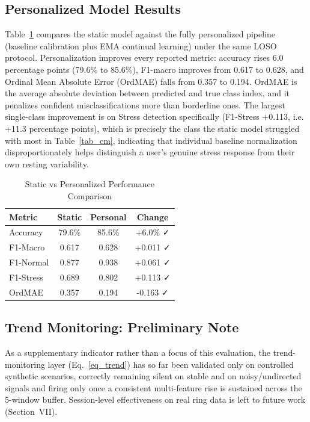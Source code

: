 \documentclass[conference]{IEEEtran}
\begin{document}
\subsection{Personalized Model Results}
Table~\ref{tab_comparison} compares the static model
against the fully personalized pipeline
(baseline calibration plus EMA continual learning) under the
same LOSO protocol. Personalization improves every reported
metric: accuracy rises 6.0 percentage points (79.6\% to
85.6\%), F1-macro improves from 0.617 to 0.628, and Ordinal
Mean Absolute Error (OrdMAE) falls from 0.357 to 0.194. OrdMAE
is the average absolute deviation between predicted and true
class index, and it penalizes confident misclassifications
more than borderline ones. The largest single-class improvement is
on Stress detection specifically (F1-Stress +0.113, i.e.
+11.3 percentage points), which is precisely the class the
static model struggled with most in Table~\ref{tab_cm},
indicating that individual baseline normalization
disproportionately helps distinguish a user's genuine stress
response from their own resting variability.

\begin{table}[htbp]
\caption{Static vs Personalized
Performance Comparison}
\begin{center}
\begin{tabular}{|l|c|c|c|}
\hline
\textbf{Metric} &
\textbf{Static} &
\textbf{Personal} &
\textbf{Change} \\
\hline
Accuracy & 79.6\% & 85.6\% & +6.0\% ✓ \\
F1-Macro & 0.617 & 0.628 & +0.011 ✓ \\
F1-Normal & 0.877 & 0.938 & +0.061 ✓ \\
F1-Stress & 0.689 & 0.802 & +0.113 ✓ \\
OrdMAE & 0.357 & 0.194 & -0.163 ✓ \\
\hline
\end{tabular}
\label{tab_comparison}
\end{center}
\end{table}

\subsection{Trend Monitoring: Preliminary Note}
As a supplementary indicator rather than a focus of this
evaluation, the trend-monitoring layer (Eq.~\ref{eq_trend})
has so far been validated only on controlled synthetic
scenarios, correctly remaining silent on stable and on
noisy/undirected signals and firing only once a consistent
multi-feature rise is sustained across the 5-window buffer.
Session-level effectiveness on real ring data is left to
future work (Section~VII).
\end{document}
